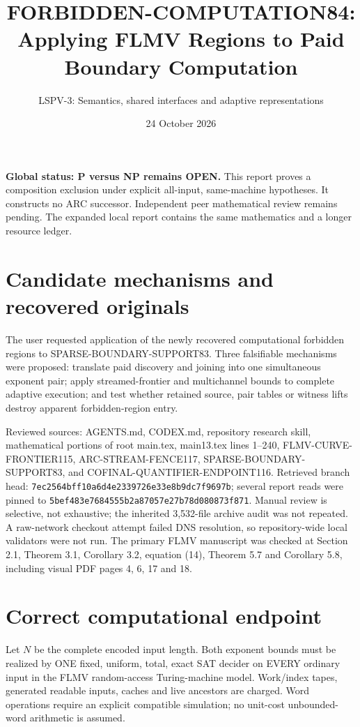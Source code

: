 \documentclass[11pt]{article}
\title{FORBIDDEN-COMPUTATION84: Applying FLMV Regions to Paid Boundary Computation}
\author{LSPV-3: Semantics, shared interfaces and adaptive representations}
\date{24 October 2026}
\begin{document}
\maketitle
\noindent\textbf{Global status: P versus NP remains OPEN.} This report proves a composition exclusion under explicit all-input, same-machine hypotheses. It constructs no ARC successor. Independent peer mathematical review remains pending. The expanded local report contains the same mathematics and a longer resource ledger.

\section{Candidate mechanisms and recovered originals}
The user requested application of the newly recovered computational forbidden regions to SPARSE-BOUNDARY-SUPPORT83. Three falsifiable mechanisms were proposed: translate paid discovery and joining into one simultaneous exponent pair; apply streamed-frontier and multichannel bounds to complete adaptive execution; and test whether retained source, pair tables or witness lifts destroy apparent forbidden-region entry.

Reviewed sources: AGENTS.md, CODEX.md, repository research skill, mathematical portions of root main.tex, main13.tex lines 1--240, FLMV-CURVE-FRONTIER115, ARC-STREAM-FENCE117, SPARSE-BOUNDARY-SUPPORT83, and COFINAL-QUANTIFIER-ENDPOINT116. Retrieved branch head: \texttt{7ec2564bff10a6d4e2339726e33e8b9dc7f9697b}; several report reads were pinned to \texttt{5bef483e7684555b2a87057e27b78d080873f871}. Manual review is selective, not exhaustive; the inherited 3,532-file archive audit was not repeated. A raw-network checkout attempt failed DNS resolution, so repository-wide local validators were not run. The primary FLMV manuscript was checked at Section 2.1, Theorem 3.1, Corollary 3.2, equation (14), Theorem 5.7 and Corollary 5.8, including visual PDF pages 4, 6, 17 and 18.

\section{Correct computational endpoint}
Let $N$ be the complete encoded input length. Both exponent bounds must be realized by ONE fixed, uniform, total, exact SAT decider on EVERY ordinary input in the FLMV random-access Turing-machine model. Work/index tapes, generated readable inputs, caches and live ancestors are charged. Word operations require an explicit compatible simulation; no unit-cost unbounded-word arithmetic is assumed.
\end{document}
